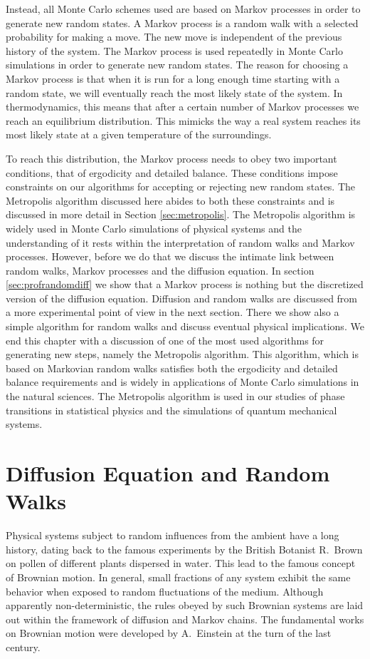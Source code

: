 Instead, all Monte Carlo schemes used are based on Markov processes in order to generate new
random states. A Markov process is a random walk with a selected probability for making a
move. The new move is independent of the previous history of the system. 
The Markov process is used repeatedly in Monte Carlo simulations in order to generate
new random states. 
The reason for choosing a Markov process is that when it is run for a 
long enough time starting with a random state, 
we will eventually reach the most likely state of the system.
In thermodynamics, this means that after a certain number of Markov processes
we reach an equilibrium distribution. 
This mimicks the way a real system reaches 
its most likely state at a given temperature of the surroundings. 

To reach this distribution, the Markov process needs to obey two important conditions, that of
ergodicity and detailed balance. These conditions impose constraints on our algorithms
for accepting or rejecting new random states. The Metropolis algorithm discussed here 
abides to both these constraints and is discussed in more detail in Section 
\ref{sec:metropolis}. 
The Metropolis algorithm is widely used in Monte Carlo 
simulations of physical systems and the understanding of it rests within 
the interpretation of random walks and Markov processes.
However, before we do that we discuss the intimate link between
random walks, Markov processes and the diffusion equation. In section 
\ref{sec:profrandomdiff}
we show that a Markov process is nothing but 
the discretized version of the diffusion equation.
Diffusion and random walks are discussed from a more experimental point of view in the 
next section. There we show also a simple algorithm for random walks and discuss eventual
physical implications. 
We end this chapter with a discussion of one of the most used algorithms for generating new steps, namely the Metropolis
algorithm. This algorithm, which is based on  Markovian random walks satisfies both the ergodicity and detailed balance
requirements and is widely in applications of Monte Carlo simulations in the natural sciences.  
The Metropolis algorithm is used in our studies of phase transitions in statistical physics and 
the simulations of quantum mechanical systems.  
\section{Diffusion Equation and Random Walks}\label{sec:diffrandom}
Physical systems subject to random influences from the ambient have a long history,
dating back to the famous experiments by the British Botanist R.~Brown on
 pollen of different plants dispersed in water. This lead to the famous concept of Brownian
motion. In general, small fractions of any system exhibit the same behavior when exposed 
to random fluctuations of the medium. Although apparently non-deterministic, the rules
obeyed by such Brownian systems are laid out within the framework of diffusion and 
Markov chains. The fundamental works on Brownian motion were developed by A.~Einstein
at the turn of the last century.

